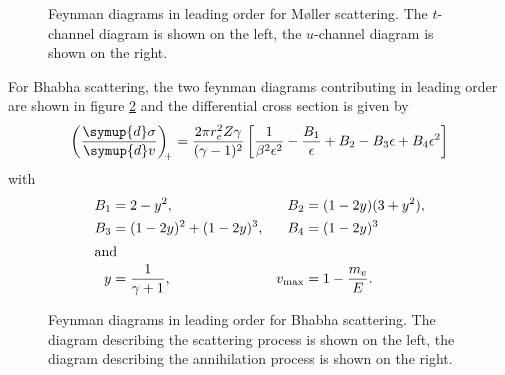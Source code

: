 \begin{figure}
    \centering
    
    \caption{Feynman diagrams in leading order for M{\o}ller scattering. The $t$-channel diagram is shown on the left, the $u$-channel diagram is shown on the right.}
    \label{fig:feynman_moller}
\end{figure}

For Bhabha scattering, the two feynman diagrams contributing in leading order are shown in figure \ref{fig:feynman_bhabha} and the differential cross section \cite{PhysRev.93.38} is given by
%
\begin{equation}
	\label{eqn:bhabha}
	\left(\frac{\symup{d}\sigma}{\symup{d}v}\right)_{\!\!+} = \frac{2 \pi r_e^2 Z \gamma}{(\gamma - 1)^2} \left[ \frac{1}{\beta^2 \epsilon^2} - \frac{B_1}{\epsilon} + B_2 - B_3 \epsilon + B_4 \epsilon^2 \right]
\end{equation}
%
with
%
\begin{align*}
	B_1 &= 2 - y^2, & B_2 &= (1 - 2y)(3 + y^2), \\ 
	B_3 &= (1-2y)^2 + (1 - 2y)^3, & B_4 &= (1 - 2y)^3 \\
	\intertext{and}
	y &= \frac{1}{\gamma + 1}, & v_{\text{max}} &= 1 - \frac{m_e}{E}.
\end{align*}

\begin{figure}
    \centering
    
    \caption{Feynman diagrams in leading order for Bhabha scattering. The diagram describing the scattering process is shown on the left, the diagram describing the annihilation process is shown on the right.}
    \label{fig:feynman_bhabha}
\end{figure}

